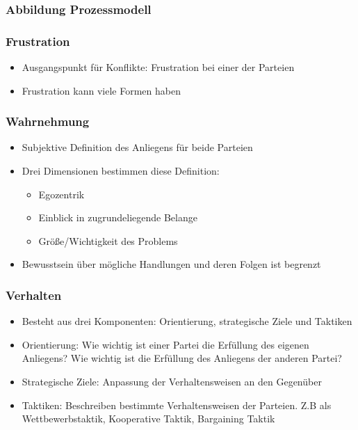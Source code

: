 \documentclass[12pt,a4paper]{beamer}
\begin{document}
\begin{frame}
	\frametitle{Abbildung Prozessmodell}
	\begin{itemize}
	\end{itemize}
\end{frame}

\begin{frame}
	\frametitle{Frustration}
	\begin{itemize}
		\item Ausgangspunkt für Konflikte: Frustration bei einer der Parteien
		\item Frustration kann viele Formen haben
	\end{itemize}
\end{frame}

\begin{frame}
	\frametitle{Wahrnehmung}
	\begin{itemize}
		\item Subjektive Definition des Anliegens für beide Parteien
		\item Drei Dimensionen bestimmen diese Definition:
		\begin{itemize}
			\item Egozentrik
			\item Einblick in zugrundeliegende Belange
			\item Größe/Wichtigkeit des Problems
		\end{itemize}
		\item Bewusstsein über mögliche Handlungen und deren Folgen ist begrenzt
	\end{itemize}
\end{frame}

\begin{frame}
	\frametitle{Verhalten}
	\begin{itemize}
		\item Besteht aus drei Komponenten: Orientierung, strategische Ziele und Taktiken
		\item Orientierung: Wie wichtig ist einer Partei die Erfüllung des eigenen Anliegens? Wie wichtig ist die Erfüllung des Anliegens der anderen Partei?
		\item Strategische Ziele: Anpassung der Verhaltensweisen an den Gegenüber
		\item Taktiken: Beschreiben bestimmte Verhaltensweisen der Parteien. Z.B als Wettbewerbstaktik, Kooperative Taktik, Bargaining Taktik
	\end{itemize}
\end{frame}
\end{document}
